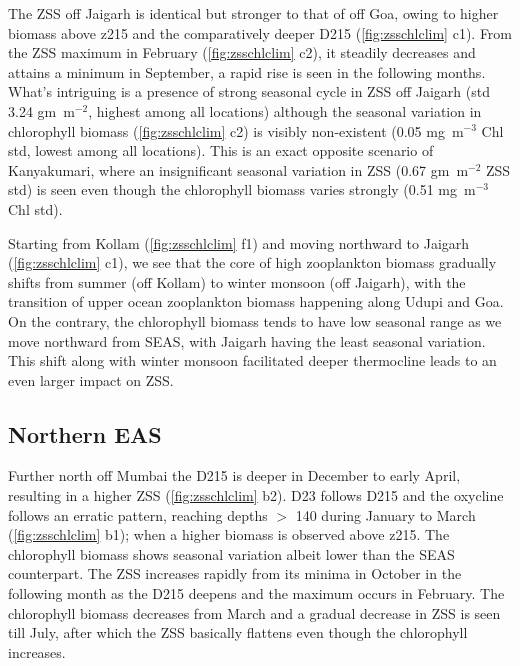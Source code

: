\documentclass{article}
\begin{document}
	The ZSS off Jaigarh is identical but stronger to that of off Goa, owing to higher biomass above z215 and the comparatively deeper D215 (\cref{fig:zsschlclim} c1). 
	From the ZSS maximum in February (\cref{fig:zsschlclim} c2), it steadily decreases and attains a minimum in September, a rapid rise is seen in the following months. What's intriguing is a presence of strong seasonal cycle in ZSS off Jaigarh (std 3.24 gm~m$^{-2}$, highest among all locations) although the seasonal variation in chlorophyll biomass (\cref{fig:zsschlclim} c2) is visibly non-existent (0.05 mg~m$^{-3}$ Chl std, lowest among all locations). This is an exact opposite scenario of Kanyakumari, where an insignificant seasonal variation in ZSS (0.67 gm~m$^{-2}$ ZSS std) is seen even though the chlorophyll biomass varies strongly (0.51 mg~m$^{-3}$ Chl std). 
		
	Starting from Kollam (\cref{fig:zsschlclim} f1) and moving northward to Jaigarh (\cref{fig:zsschlclim} c1), we see that the core of high zooplankton biomass gradually shifts from summer (off Kollam) to winter monsoon (off Jaigarh), with the transition of upper ocean zooplankton biomass happening along Udupi and Goa. On the contrary, the chlorophyll biomass tends to have low seasonal range as we move northward from SEAS, with Jaigarh having the least seasonal variation. This shift along with winter monsoon facilitated deeper thermocline leads to an even larger impact on ZSS.
	 
	\subsection{Northern EAS}
	Further north off Mumbai the D215 is deeper in December to early April, resulting in a higher ZSS (\cref{fig:zsschlclim} b2). D23 follows D215 and the oxycline follows an erratic pattern, reaching depths $>$ 140 during January to March (\cref{fig:zsschlclim} b1); when a higher biomass is observed above z215. The chlorophyll biomass shows seasonal variation albeit lower than the SEAS counterpart. The ZSS increases rapidly from its minima in October in the following month as the D215 deepens and the maximum occurs in February. The chlorophyll biomass decreases from March and a gradual decrease in ZSS is seen till July, after which the ZSS basically flattens even though the chlorophyll increases. 
	
\end{document}
